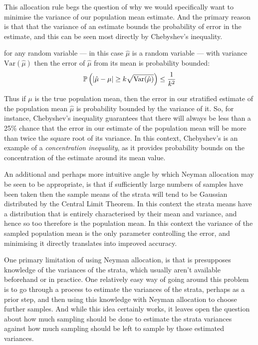 This allocation rule begs the question of why we would specifically want to minimise the variance of our population mean estimate.
And the primary reason is that that the variance of an estimate bounds the probability of error in the estimate, and this can be seen most directly by Chebyshev's inequality.

\begin{theorem}\label{thm:chebyshevs}
for any random variable --- in this case $\hat{\mu}$ is a random variable --- with variance $\text{Var}(\hat{\mu})$ then the error of $\hat{\mu}$ from its mean is probability bounded:
$$ \operatorname{\mathbb{P}}\left(|\hat{\mu}-\mu|\ge k\sqrt{\text{Var}(\hat{\mu})}\right)\le\frac{1}{k^2} $$
\end{theorem}

Thus if $\mu$ is the true population mean, then the error in our stratified estimate of the population mean $\hat{\mu}$ is probability bounded by the variance of it.
So, for instance, Chebyshev's inequality guarantees that there will always be less than a 25\% chance that the error in our estimate of the population mean will be more than twice the square root of its variance.
In this context, Chebyshev's is an example of a \textit{concentration inequality}, as it provides probability bounds on the concentration of the estimate around its mean value.

An additional and perhaps more intuitive angle by which Neyman allocation may be seen to be appropriate, is that if sufficiently large numbers of samples have been taken then the sample means of the strata will tend to be Gaussian distributed by the Central Limit Theorem.
In this context the strata means have a distribution that is entirely characterised by their mean and variance, and hence so too therefore is the population mean.
In this context the variance of the sampled population mean is the only parameter controlling the error, and minimising it directly translates into improved accuracy.

One primary limitation of using Neyman allocation, is that is presupposes knowledge of the variances of the strata, which usually aren't available beforehand or in practice.
One relatively easy way of going around this problem is to go through a process to estimate the variances of the strata, perhaps as a prior step, and then using this knowledge with Neyman allocation to choose further samples.
And while this idea certainly works, it leaves open the question about how much sampling should be done to estimate the strata variances against how much sampling should be left to sample by those estimated variances.

